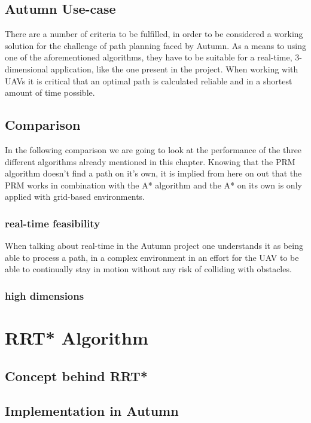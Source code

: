 \subsection{Autumn Use-case}

There are a number of criteria to be fulfilled, in order to be considered a working solution for the challenge of path planning faced by Autumn.
As a means to using one of the aforementioned algorithms, they have to be suitable for a real-time, 3-dimensional application, like the one present in the project.
When working with UAVs it is critical that an optimal path is calculated reliable and in a shortest amount of time possible. 

\subsection{Comparison}

In the following comparison we are going to look at the performance of the three different algorithms already mentioned in this chapter. Knowing that the PRM algorithm doesn't find a path on it's own, it is implied from here on out that the PRM works in combination with the A* algorithm and the A* on its own is only applied with grid-based environments.  

\subsubsection{real-time feasibility}

When talking about real-time in the Autumn project one understands it as being able to process a path, in a complex environment in an effort for the UAV to be able to continually stay in motion without any risk of colliding with obstacles. 

\subsubsection{high dimensions}

\section{RRT* Algorithm}

\subsection{Concept behind RRT*}

\subsection{Implementation in Autumn}


